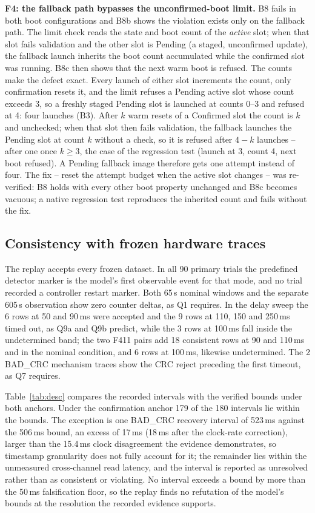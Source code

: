 \documentclass[conference,a4paper]{IEEEtran}
\begin{document}
\textbf{F4: the fallback path bypasses the unconfirmed-boot limit.} B8 fails in both boot configurations and B8b shows the violation exists only on the fallback path. The limit check reads the state and boot count of the \emph{active} slot; when that slot fails validation and the other slot is Pending (a staged, unconfirmed update), the fallback launch inherits the boot count accumulated while the confirmed slot was running. B8c then shows that the next warm boot is refused. The counts make the defect exact. Every launch of either slot increments the count, only confirmation resets it, and the limit refuses a Pending active slot whose count exceeds 3, so a freshly staged Pending slot is launched at counts 0--3 and refused at 4: four launches (B3). After $k$ warm resets of a Confirmed slot the count is $k$ and unchecked; when that slot then fails validation, the fallback launches the Pending slot at count $k$ without a check, so it is refused after $4-k$ launches -- after one once $k\ge3$, the case of the regression test (launch at 3, count 4, next boot refused). A Pending fallback image therefore gets one attempt instead of four. The fix -- reset the attempt budget when the active slot changes -- was re-verified: B8 holds with every other boot property unchanged and B8c becomes vacuous; a native regression test reproduces the inherited count and fails without the fix.



\subsection{Consistency with frozen hardware traces}
\label{sec:conf}
The replay accepts every frozen dataset. In all 90 primary trials the predefined detector marker is the model's first observable event for that mode, and no trial recorded a controller restart marker. Both 65\,s nominal windows and the separate 605\,s observation show zero counter deltas, as Q1 requires. In the delay sweep the 6 rows at 50 and 90\,ms were accepted and the 9 rows at 110, 150 and 250\,ms timed out, as Q9a and Q9b predict, while the 3 rows at 100\,ms fall inside the undetermined band; the two F411 pairs add 18 consistent rows at 90 and 110\,ms and in the nominal condition, and 6 rows at 100\,ms, likewise undetermined. The 2 BAD\_CRC mechanism traces show the CRC reject preceding the first timeout, as Q7 requires.

Table~\ref{tab:desc} compares the recorded intervals with the verified bounds under both anchors. Under the confirmation anchor 179 of the 180 intervals lie within the bounds. The exception is one BAD\_CRC recovery interval of 523\,ms against the 506\,ms bound, an excess of 17\,ms (18\,ms after the clock-rate correction), larger than the 15.4\,ms clock disagreement the evidence demonstrates, so timestamp granularity does not fully account for it; the remainder lies within the unmeasured cross-channel read latency, and the interval is reported as unresolved rather than as consistent or violating. No interval exceeds a bound by more than the 50\,ms falsification floor, so the replay finds no refutation of the model's bounds at the resolution the recorded evidence supports.
\end{document}
